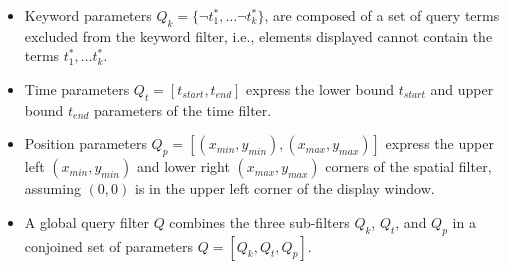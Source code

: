 \begin{itemize}
\item Keyword parameters $Q_k=\{\neg t_{1}^{*},\dots \neg t_{k}^{*}\}$, are composed of a set of query terms excluded from the keyword filter, i.e., elements displayed cannot contain the terms $t_{1}^{*},\dots t_{k}^{*}$.
\item Time parameters $Q_t=[t_{start},t_{end}]$ express the lower bound $t_{start}$ and upper bound $t_{end}$ parameters of the time filter.
\item Position parameters $Q_p=[(x_{min},y_{min}),(x_{max},y_{max})]$ express the upper left $(x_{min},y_{min})$ and lower right $(x_{max},y_{max})$ corners of the spatial filter, assuming $(0,0)$ is in the upper left corner of the display window.  
\item A global query filter $Q$ combines the three sub-filters $Q_k$, $Q_t$, and $Q_p$ in a conjoined set of parameters 
$Q=[Q_k, Q_t, Q_p]$. 

\end{itemize}










